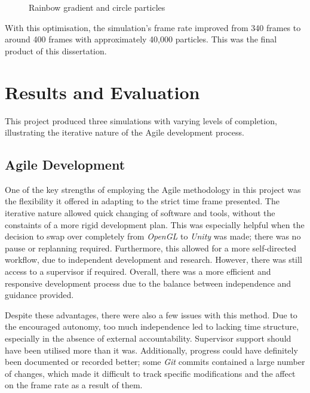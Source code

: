 \documentclass[12pt]{article}
\newcommand{\wideimage}[2][]{%
  \makebox[\textwidth][c]{\texttt{[image: \#2]}}%
}
\begin{document}
    \begin{figure}[H]
        \begin{center}
            \wideimage[width=0.5\textwidth]{finalAppearance.png}
            \caption{Rainbow gradient and circle particles}
        \end{center}
    \end{figure}

    With this optimisation, the simulation's frame rate improved from 340 frames to around 400 frames with approximately 40,000 particles. This was the final product of this dissertation.

    \newpage

    \section{Results and Evaluation}
    \label{sec:resultsandevaluation}

    This project produced three simulations with varying levels of completion, illustrating the iterative nature of the Agile development process.

    \subsection{Agile Development}

    One of the key strengths of employing the Agile methodology in this project was the flexibility it offered in adapting to the strict time frame presented. The iterative nature allowed quick changing of software and tools, without the constaints of a more rigid development plan. This was especially helpful when the decision to swap over completely from \textit{OpenGL} to \textit{Unity} was made; there was no pause or replanning required. Furthermore, this allowed for a more self-directed workflow, due to independent development and research. However, there was still access to a supervisor if required. Overall, there was a more efficient and responsive development process due to the balance between independence and guidance provided.

    Despite these advantages, there were also a few issues with this method. Due to the encouraged autonomy, too much independence led to lacking time structure, especially in the absence of external accountability. Supervisor support should have been utilised more than it was. Additionally, progress could have definitely been documented or recorded better; some \textit{Git} commits contained a large number of changes, which made it difficult to track specific modifications and the affect on the frame rate as a result of them.
\end{document}
